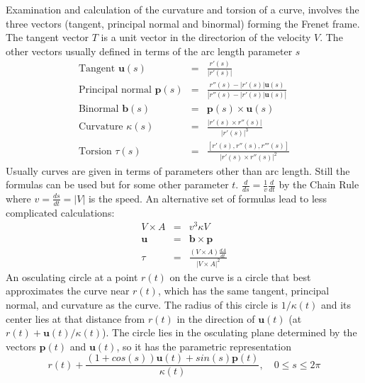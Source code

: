 Examination and calculation of the curvature and torsion of a curve,
involves the three vectors (tangent, principal normal and binormal)
forming the Frenet frame. The tangent vector $T$ is a unit vector in
the directorion of the velocity $V$. The other vectors usually defined
in terms of the arc length parameter $s$
\begin{eqnarray}
  \text{Tangent } \mathbf{u}(s) &=& \frac{r'(s)}{\lvert r'(s) \rvert} \\
  \text{Principal normal } \mathbf{p}(s) &=& \frac{r''(s) - \lvert r'(s) \rvert \mathbf{u}(s)}{\left\lvert r''(s) - \lvert r'(s) \rvert \mathbf{u}(s) \right\rvert} \\
  \text{Binormal } \mathbf{b}(s) &=& \mathbf{p}(s) \times \mathbf{u}(s) \\
  \text{Curvature } \kappa(s) &=& \frac{\lvert r'(s) \times r''(s) \rvert}{\lvert r'(s) \rvert^3} \\
  \text{Torsion } \tau(s) &=& \frac{[r'(s),r''(s),r'''(s)]}{\lvert r'(s) \times r''(s) \rvert^2}
\end{eqnarray}
Usually curves are given in terms of parameters other than arc
length. Still the formulas can be used but for some other parameter
$t$. $\frac{d}{ds}=\frac{1}{v}\frac{d}{dt}$ by the Chain Rule where
$v=\frac{ds}{dt}=\lvert V\rvert$ is the speed. An alternative set of
formulas lead to less complicated calculations:
\begin{eqnarray}
  V \times A &=& v^3\kappa V \\
  \mathbf{u} &=& \mathbf{b} \times \mathbf{p} \\
  \tau &=& \frac{(V \times A) \frac{dA}{dt}}{\lvert V \times A\rvert^2}
\end{eqnarray}
An osculating circle at a point $r(t)$ on the curve is a circle that
best approximates the curve near $r(t)$, which has the same tangent,
principal normal, and curvature as the curve. The radius of this
circle is $1 / \kappa(t)$ and its center lies at that distance from
$r(t)$ in the direction of $\mathbf{u}(t)$ (at $r(t) +
\mathbf{u}(t)/\kappa(t)$). The circle lies in the osculating plane
determined by the vectors $\mathbf{p}(t)$ and $\mathbf{u}(t)$, so it
has the parametric representation
\begin{equation}
  r(t) + \frac{(1 + cos(s))\mathbf{u}(t) +
    sin(s)\mathbf{p}(t)}{\kappa(t)}, 
  \quad 0 \leq s \leq 2\pi
\end{equation}

\clearemptydoublepage

